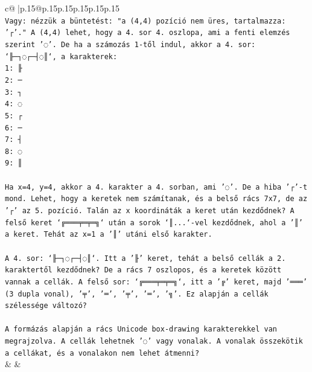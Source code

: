 \documentclass{article}
\begin{document}
{\begin{supertabular}{c@{$\;$}|p{.15\linewidth}@{}p{.15\linewidth}p{.15\linewidth}p{.15\linewidth}p{.15\linewidth}p{.15\linewidth}}
{{{\\ 
\texttt{Vagy: nézzük a büntetést: "a (4,4) pozíció nem üres, tartalmazza: '┌'." A (4,4) lehet, hogy a 4. sor 4. oszlopa, ami a fenti elemzés szerint '◌'. De ha a számozás 1{-}től indul, akkor a 4. sor: `╟─┐◌┌─┤◌║`, a karakterek:} \\
\texttt{1: ╟} \\
\texttt{2: ─} \\
\texttt{3: ┐} \\
\texttt{4: ◌} \\
\texttt{5: ┌} \\
\texttt{6: ─} \\
\texttt{7: ┤} \\
\texttt{8: ◌} \\
\texttt{9: ║} \\
\\ 
\texttt{Ha x=4, y=4, akkor a 4. karakter a 4. sorban, ami '◌'. De a hiba '┌'{-}t mond. Lehet, hogy a keretek nem számítanak, és a belső rács 7x7, de az '┌' az 5. pozíció. Talán az x koordináták a keret után kezdődnek? A felső keret `╔═══╤═╤═╗` után a sorok `║...`{-}vel kezdődnek, ahol a '║' a keret. Tehát az x=1 a '║' utáni első karakter. } \\
\\ 
\texttt{A 4. sor: `╟─┐◌┌─┤◌║`. Itt a '╟' keret, tehát a belső cellák a 2. karaktertől kezdődnek? De a rács 7 oszlopos, és a keretek között vannak a cellák. A felső sor: `╔═══╤═╤═╗`, itt a '╔' keret, majd '═══' (3 dupla vonal), '╤', '═', '╤', '═', '╗'. Ez alapján a cellák szélessége változó? } \\
\\ 
\texttt{A formázás alapján a rács Unicode box{-}drawing karakterekkel van megrajzolva. A cellák lehetnek '◌' vagy vonalak. A vonalak összekötik a cellákat, és a vonalakon nem lehet átmenni?} \\
            }
        }
    }
    & & \\ \\


\end{supertabular}}
\end{document}
